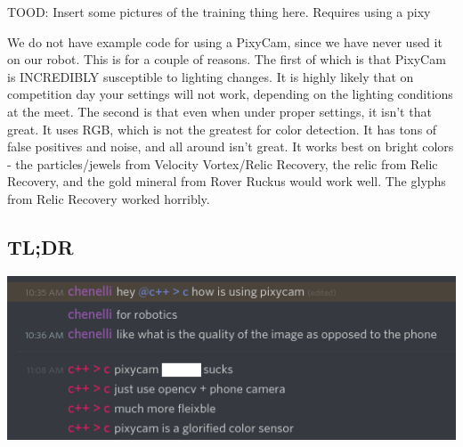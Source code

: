 \documentclass[../main.tex]{subfiles}
\begin{document}
TOOD: Insert some pictures of the training thing here. Requires using a pixy

We do not have example code for using a PixyCam, since we have never used it on our robot. This is for a couple of reasons. The first of which is that PixyCam is INCREDIBLY susceptible to lighting changes. It is highly likely that on competition day your settings will not work, depending on the lighting conditions at the meet. The second is that even when under proper settings, it isn't that great. It uses RGB, which is not the greatest for color detection. It has tons of false positives and noise, and all around isn't great. It works best on bright colors - the particles/jewels from Velocity Vortex/Relic Recovery, the relic from Relic Recovery, and the gold mineral from Rover Ruckus would work well. The glyphs from Relic Recovery worked horribly. 

\subsection{TL;DR}
\includegraphics[width=400pt]{sections/vision/images/2019-02-27-195334_3840x1080_scrot_cropped.png}
\end{document}
